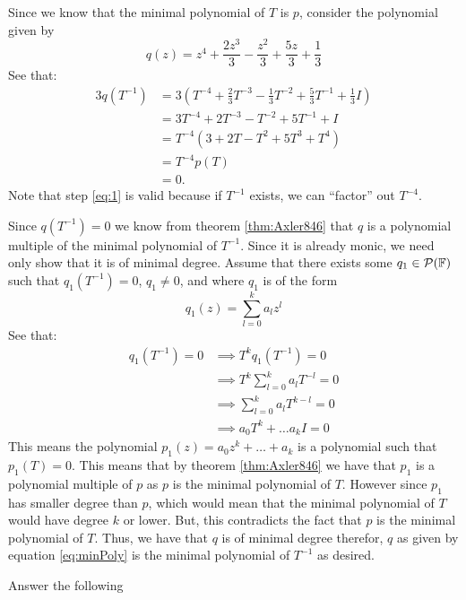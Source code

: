 \documentclass[answers]{exam}
\begin{document}
\begin{questions}
\begin{parts}
\begin{solution}
            Since we know that the minimal polynomial of $T$ is $p$, consider the polynomial given by
            \begin{equation}\label{eq:minPoly}
                q(z) = z^4 + \frac{2z^3}{3} - \frac{z^2}{3} + \frac{5z}{3} + \frac{1}{3}
            \end{equation}
            See that:
            \begin{align}
                3q\left(T^{-1}\right) &= 3\left(T^{-4} + \frac{2}{3}T^{-3} - \frac{1}{3}T^{-2} + \frac{5}{3}T^{-1} + \frac{1}{3}I\right)\nonumber \\
                &= 3T^{-4} + 2T^{-3} - T^{-2} + 5T^{-1} + I \nonumber\\
                &= T^{-4}\left(3 + 2T - T^2 + 5T^3 + T^4\right) \label{eq:1} \\
                &= T^{-4}p(T) \nonumber\\
                &= 0.
            \end{align}
            Note that step \ref{eq:1} is valid because if $T^{-1}$ exists, we can ``factor'' out $T^{-4}$.

            Since $q\left(T^{-1}\right)=0$ we know from theorem \ref{thm:Axler846} that $q$ is a polynomial 
            multiple of the minimal polynomial of $T^{-1}$. Since it is already monic, we need only show
            that it is of minimal degree. Assume that there exists some $q_1\in\mathcal{P}(\mathbb{F})$ such that 
            $q_1\left(T^{-1}\right) = 0$, $q_1 \neq 0$, and where $q_1$ is of the form 
            \begin{equation*}
                q_1(z) = \sum_{l=0}^{k} a_lz^l
            \end{equation*}
            See that:
            \begin{align*}
                q_1\left(T^{-1}\right) =0 &\implies T^kq_1\left(T^{-1}\right) = 0 \\
                &\implies T^k\sum_{l=0}^{k} a_lT^{-l} = 0 \\
                &\implies \sum_{l=0}^k a_lT^{k-l} = 0 \\
                &\implies a_0T^k + \dots a_kI = 0
            \end{align*}
            This means the polynomial $p_1(z) = a_0z^k + \dots + a_k$ is a polynomial such that 
            $p_1(T) = 0$. This means that by theorem \ref{thm:Axler846} we have that $p_1$ is a polynomial 
            multiple of $p$ as $p$ is the minimal polynomial of $T$. However since $p_1$ has smaller
            degree than $p$, which would mean that the minimal polynomial of $T$ would have degree $k$ or lower.
            But, this contradicts the fact that $p$ is the minimal polynomial of $T$. Thus, we have that $q$ is 
            of minimal degree therefor, $q$ as given by equation \ref{eq:minPoly} is the minimal polynomial of 
            $T^{-1}$ as desired.
        \end{solution}
    \end{parts}
    \question Answer the following
    \begin{parts}

\end{parts}
\end{questions}
\end{document}
